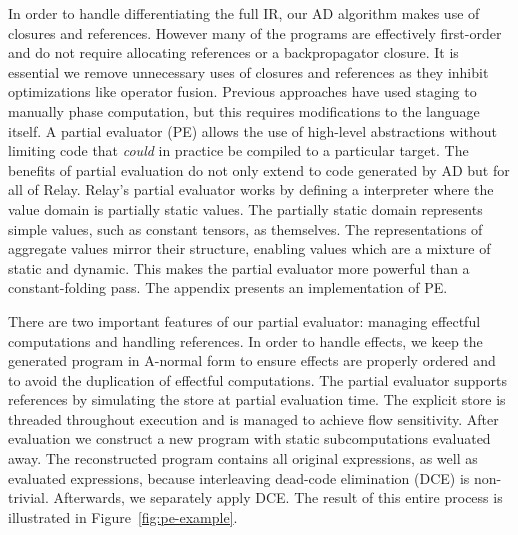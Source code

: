 In order to handle differentiating the full IR,
  our AD algorithm makes use of closures and references.
However many of the programs are effectively
  first-order and do not require allocating
  references or a backpropagator closure.
It is essential we remove unnecessary uses
  of closures and references as they inhibit
  optimizations like operator fusion.
Previous approaches have used staging to manually
  phase computation, but this requires modifications
  to the language itself.
A partial evaluator (PE) allows the use of high-level abstractions
  without limiting code that \textit{could} in practice be
  compiled to a particular target.
The benefits of partial evaluation do not only extend to code
  generated by AD but for all of Relay.
Relay's partial evaluator works by defining a interpreter
  where the value domain is partially static values.
The partially static domain represents simple values,
  such as constant tensors, as themselves. The representations
  of aggregate values mirror their structure, enabling
  values which are a mixture of static and dynamic.
This makes the partial evaluator more powerful
  than a constant-folding pass.
The appendix presents an implementation of PE.

There are two important features of our partial evaluator:
  managing effectful computations and handling references.
In order to handle effects, we keep the generated
  program in A-normal form to ensure effects are properly ordered
  and to avoid the duplication of effectful computations.
The partial evaluator supports references by
  simulating the store at partial evaluation time.
The explicit store is threaded throughout execution
  and is managed to achieve flow sensitivity.
After evaluation we construct a new program with
  static subcomputations evaluated
  away.
The reconstructed program contains all original
  expressions, as well as evaluated expressions,
  because interleaving dead-code elimination (DCE) is
  non-trivial.
Afterwards, we separately apply DCE.
The result of this entire process is illustrated
  in Figure~\ref{fig:pe-example}.


